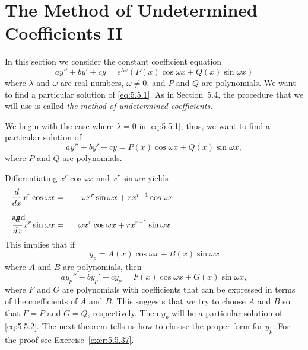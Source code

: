 \section{The Method of Undetermined Coefficients II}

\noindent
In this section we consider the constant coefficient equation
\begin{equation}
  \label{eq:5.5.1}ay''+by'+cy=e^{\lambda x}\left(P(x)\cos\omega x+Q(x)\sin\omega x\right)
\end{equation}
where $\lambda$ and $\omega$ are real numbers, $\omega\ne0$, and $P$ and $Q$ are polynomials. We
want to find a particular solution of \eqref{eq:5.5.1}. As in Section~5.4, the procedure that we
will use is called {\color{blue}\it the method of undetermined coefficients\/}.


\noindent
We begin with the case where $\lambda=0$ in \eqref{eq:5.5.1}; thus, we want to find a particular
solution of
\begin{equation}
  \label{eq:5.5.2}ay''+by'+cy=P(x)\cos\omega x+Q(x)\sin\omega x,
\end{equation}
where $P$ and $Q$ are polynomials.

Differentiating $x^{r}\cos\omega x$ and $x^{r}\sin\omega x$ yields
\begin{eqnarray*}
  \dst\frac{d}{dx}x^{r}\cos\omega x                & = & -\omega x^{r}\sin\omega x+rx^{r-1}\cos\omega x \\[2\jot]
  \arraytext{and}\dst\frac{d}{dx}x^{r}\sin\omega x & = & \phantom{-}\omega x^{r}\cos\omega x+rx^{r-1}\sin\omega x.
\end{eqnarray*}
This implies that if
\[
  y_{p}=A(x)\cos\omega x+B(x)\sin\omega x
\]
where $A$ and $B$ are polynomials, then
\[
  ay_{p}''+by_{p}'+cy_{p}=F(x)\cos\omega x+G(x)\sin\omega x,
\]
where $F$ and $G$ are polynomials with coefficients that can be expressed in terms of the
coefficients of $A$ and $B$. This suggests that we try to choose $A$ and $B$ so that $F=P$ and
$G=Q$, respectively. Then $y_{p}$ will be a particular solution of \eqref{eq:5.5.2}. The next
theorem tells us how to choose the proper form for $y_{p}$. For the proof see
Exercise~\ref{exer:5.5.37}.

